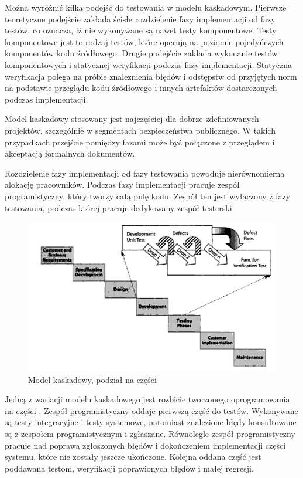 Można wyróżnić kilka podejść do testowania w modelu kaskadowym. Pierwsze teoretyczne podejście zakłada ścisłe rozdzielenie fazy implementacji od fazy testów, co oznacza, iż nie wykonywane są nawet testy komponentowe. Testy komponentowe jest to rodzaj testów, które operują na poziomie pojedyńczych komponentów kodu źródłowego. Drugie podejście zakłada wykonanie  testów komponentowych i statycznej weryfikacji podczas fazy implementacji. Statyczna weryfikacja polega na próbie znaleznienia błędów i odstępstw od przyjętych norm na podstawie przeglądu kodu źródłowego i innych artefaktów dostarczonych podczas implementacji.

Model kaskadowy stosowany jest najczęściej dla dobrze zdefiniowanych projektów, szczególnie w segmentach bezpieczeństwa publicznego. W takich przypadkach przejście pomiędzy fazami może być połączone z przeglądem i akceptacją formalnych dokumentów.

Rozdzielenie fazy implementacji od fazy testowania powoduje nierównomierną alokację pracowników. Podczas fazy implementacji pracuje zespół programistyczny, który tworzy całą pulę kodu. Zespół ten jest wyłączony z fazy testowania, podczas której pracuje dedykowany zespół testerski.

\begin{figure}[h]
\centerline{\includegraphics[scale=0.7]{img/water-wheel.png}}
\caption{Model kaskadowy, podział na części  \cite{TestingMatt}}
\label{fig:kaskadowyCzesci}
\end{figure}
Jedną z wariacji modelu kaskadowego jest rozbicie tworzonego oprogramowania na części \cite{TestingMatt}. 
Zespół programistyczny oddaje pierwszą część do testów. Wykonywane są testy integracyjne i testy systemowe, natomiast znalezione błędy konsultowane są z zespołem programistycznym i zgłaszane. Równolegle zespół programistyczny pracuje nad poprawą zgłoszonych błędów i dokończeniem implementacji części systemu, które nie zostały jeszcze ukończone. Kolejna oddana część jest poddawana testom, weryfikacji poprawionych błędów i małej regresji.

